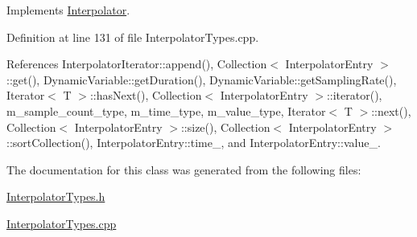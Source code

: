 Implements \hyperlink{classInterpolator_a3}{Interpolator}.

Definition at line 131 of file Interpolator\-Types.cpp.

References Interpolator\-Iterator::append(), Collection$<$ Interpolator\-Entry $>$::get(), Dynamic\-Variable::get\-Duration(), Dynamic\-Variable::get\-Sampling\-Rate(), Iterator$<$ T $>$::has\-Next(), Collection$<$ Interpolator\-Entry $>$::iterator(), m\_\-sample\_\-count\_\-type, m\_\-time\_\-type, m\_\-value\_\-type, Iterator$<$ T $>$::next(), Collection$<$ Interpolator\-Entry $>$::size(), Collection$<$ Interpolator\-Entry $>$::sort\-Collection(), Interpolator\-Entry::time\_\-, and Interpolator\-Entry::value\_\-.

The documentation for this class was generated from the following files:\begin{CompactItemize}
\item 
\hyperlink{InterpolatorTypes_8h}{Interpolator\-Types.h}\item 
\hyperlink{InterpolatorTypes_8cpp}{Interpolator\-Types.cpp}\end{CompactItemize}
